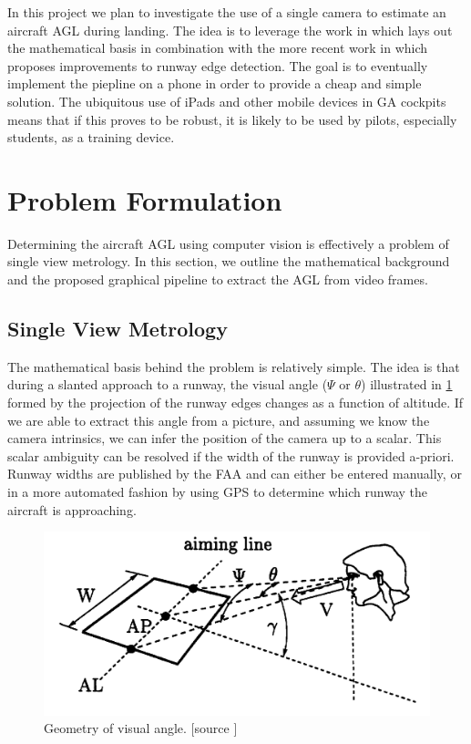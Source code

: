 \documentclass[letterpaper, conference]{IEEEtran}  %
\begin{document}
In this project we plan to investigate the use of a single camera to estimate an aircraft AGL during landing. The idea is to leverage the work in \cite{Sasa2000} which lays out the mathematical basis in combination with the more recent work in \cite{Naidu2011} which proposes improvements to runway edge detection. The goal is to eventually implement the piepline on a phone in order to provide a cheap and simple solution. The ubiquitous use of iPads and other mobile devices in GA cockpits means that if this proves to be robust, it is likely to be used by pilots, especially students, as a training device.

\section{Problem Formulation}
Determining the aircraft AGL using computer vision is effectively a problem of single view metrology. In this section, we outline the mathematical background and the proposed graphical pipeline to extract the AGL from video frames. 

\subsection{Single View Metrology}
The mathematical basis behind the problem is relatively simple. The idea is that during a slanted approach to a runway, the visual angle ($\Psi$ or $\theta$) illustrated in \cref{fig:visangle} formed by the projection of the runway edges changes as a function of altitude. If we are able to extract this angle from a picture, and assuming we know the camera intrinsics, we can infer the position of the camera up to a scalar. This scalar ambiguity can be resolved if the width of the runway is provided a-priori. Runway widths are published by the FAA and can either be entered manually, or in a more automated fashion by using GPS to determine which runway the aircraft is approaching.
\begin{figure}[h!]
	\includegraphics[width= \columnwidth]{visual_angle1.png} 
	\caption{\label{fig:visangle} Geometry of visual angle. [source \cite{Mulder2000}]}
\end{figure}
\end{document}
